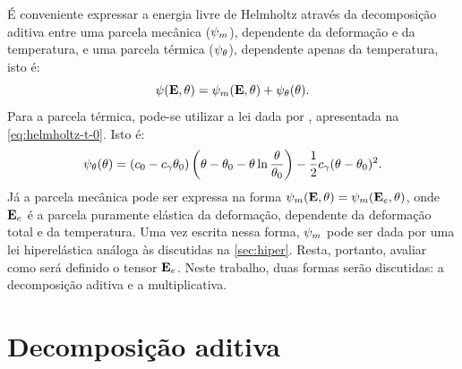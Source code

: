 \documentclass[Tese.tex]{subfiles}
\begin{document}
É conveniente expressar a energia livre de Helmholtz através da decomposição aditiva entre uma parcela mecânica ($\psi_m$), dependente da deformação e da temperatura, e uma parcela térmica ($\psi_{\theta}$), dependente apenas da temperatura, isto é:
\begin{equation}
\psi(\mathbf{E},\theta) = \psi_m(\mathbf{E},\theta) + \psi_{\theta}(\theta).
\end{equation}
Para a parcela térmica, pode-se utilizar a lei dada por , apresentada na \cref{eq:helmholtz-t-0}. Isto é:
\begin{equation}\label{eq:helmholtz-t}
\psi_{\theta}(\theta) = (c_0-c_{\gamma}\theta_0)\left(\theta-\theta_0-\theta \ln{\dfrac{\theta}{\theta_0}}\right)-\dfrac{1}{2}c_{\gamma}(\theta-\theta_0)^2.
\end{equation}
Já a parcela mecânica pode ser expressa na forma $\psi_m(\mathbf{E},\theta) = \psi_m(\mathbf{E}_e,\theta)$, onde $\mathbf{E}_e$ é a parcela puramente elástica da deformação, dependente da deformação total e da temperatura. Uma vez escrita nessa forma, $\psi_m$ pode ser dada por uma lei hiperelástica análoga às discutidas na \autoref{sec:hiper}. Resta, portanto, avaliar como será definido o tensor $\mathbf{E}_e$. Neste trabalho, duas formas serão discutidas: a decomposição aditiva e a multiplicativa.

\section{Decomposição aditiva}\label{eq:te-dec-aditiva}
\end{document}

